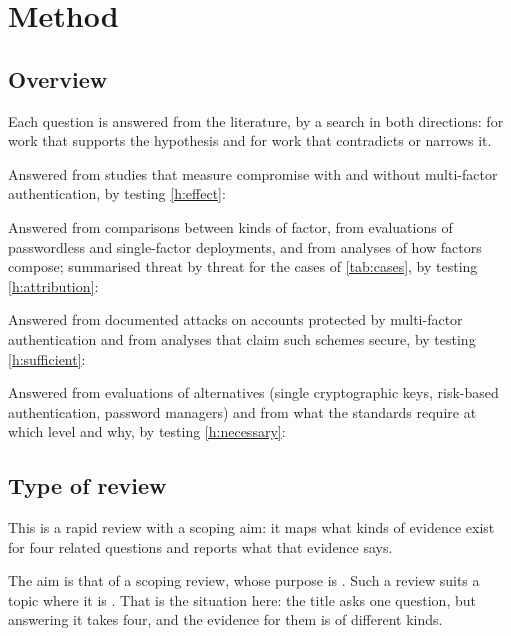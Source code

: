 \section{Method}\label{sec:method}

\subsection{Overview}\label{sec:overview}

Each question is answered from the literature, by a search in both
directions: for work that supports the hypothesis and for work that
contradicts or narrows it.

\rqeffect*
Answered from studies that measure compromise with and without
multi-factor authentication, by testing \cref{h:effect}:
\heffect*

\rqattribution*
Answered from comparisons between kinds of factor, from evaluations of
passwordless and single-factor deployments, and from analyses of how
factors compose; summarised threat by threat for the cases of
\cref{tab:cases}, by testing \cref{h:attribution}:
\hattribution*

\rqsufficient*
Answered from documented attacks on accounts protected by multi-factor
authentication and from analyses that claim such schemes secure, by
testing \cref{h:sufficient}:
\hsufficient*

\rqnecessary*
Answered from evaluations of alternatives (single cryptographic keys,
risk-based authentication, password managers) and from what the
standards require at which level and why, by testing \cref{h:necessary}:
\hnecessary*

\subsection{Type of review}\label{sec:reviewtype}

This is a rapid review with a scoping aim: it maps what kinds of evidence
exist for four related questions and reports what that evidence says.

The aim is that of a scoping review, whose purpose is
.
Such a review suits a topic where it is
.
That is the situation here: the title asks one question, but answering it
takes four, and the evidence for them is of different kinds.

